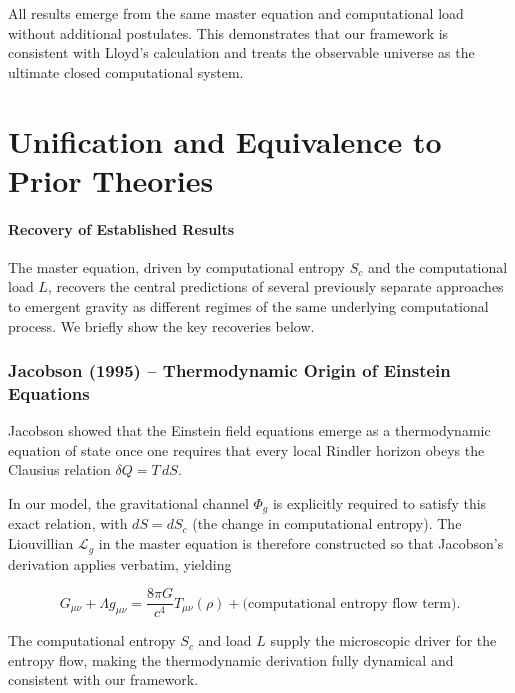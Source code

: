 \documentclass[reprint,amsmath,amssymb,aps,prd,preprintnumbers,superscriptaddress,longbibliography,10pt]{revtex4-2}
\begin{document}
All results emerge from the same master equation and computational load without additional postulates. This demonstrates that our framework is consistent with Lloyd’s calculation and treats the observable universe as the ultimate closed computational system.

\section{Unification and Equivalence to Prior Theories}

\paragraph{Recovery of Established Results}

The master equation, driven by computational entropy $  S_c  $ and the computational load $  L  $, recovers the central predictions of several previously separate approaches to emergent gravity as different regimes of the same underlying computational process. We briefly show the key recoveries below.

\subsubsection{Jacobson (1995) -- Thermodynamic Origin of Einstein Equations}
Jacobson showed that the Einstein field equations emerge as a thermodynamic equation of state once one requires that every local Rindler horizon obeys the Clausius relation $  \delta Q = T\, dS  $.

In our model, the gravitational channel $  \Phi_g  $ is explicitly required to satisfy this exact relation, with $  dS = dS_c  $ (the change in computational entropy). The Liouvillian $  \mathcal{L}_g  $ in the master equation is therefore constructed so that Jacobson’s derivation applies verbatim, yielding

$$G_{\mu\nu} + \Lambda g_{\mu\nu} = \frac{8\pi G}{c^4} T_{\mu\nu}(\rho) + \text{(computational entropy flow term)}.$$

The computational entropy $  S_c  $ and load $  L  $ supply the microscopic driver for the entropy flow, making the thermodynamic derivation fully dynamical and consistent with our framework.
\end{document}
